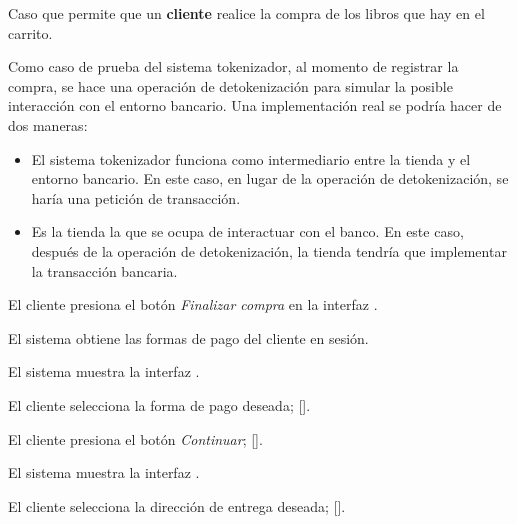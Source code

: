 %
%

{
  Caso que permite que un \textbf{cliente} realice la compra de los libros que
  hay en el carrito.

  Como caso de prueba del sistema tokenizador, al momento de registrar la
  compra, se hace una operación de detokenización para simular la posible
  interacción con el entorno bancario. Una implementación real se podría
  hacer de dos maneras:

  \begin{itemize}
    \item El sistema tokenizador funciona como intermediario entre la tienda
      y el entorno bancario. En este caso, en lugar de la operación de
      detokenización, se haría una petición de transacción.
    \item Es la tienda la que se ocupa de interactuar con el banco. En este
      caso, después de la operación de detokenización, la tienda tendría que
      implementar la transacción bancaria.
  \end{itemize}

  \begin{trayectoriaPrincipal}

    \item El cliente presiona el botón \textit{Finalizar compra} en la
      interfaz .

    \item El sistema obtiene las formas de pago del cliente en sesión.

    \item El sistema muestra la interfaz
      .

    \item El cliente selecciona la forma de pago deseada;
      [].

    \item El cliente presiona el botón \textit{Continuar};
      [].

    \item El sistema muestra la interfaz
      .

    \item El cliente selecciona la dirección de entrega deseada;
      [].


\end{trayectoriaPrincipal}}
